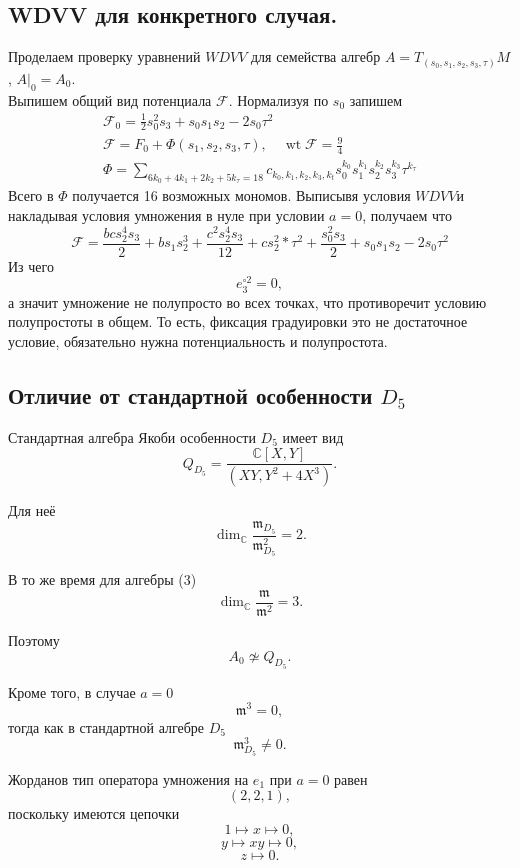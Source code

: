 \subsection{WDVV для конкретного случая.}
Проделаем проверку уравнений \(WDVV\) для семейства алгебр \(A = T_{(s_0, s_1,s_2,s_3, \tau)}M\), \(A|_0 = A_0\). \\
Выпишем общий вид потенциала \(\mathcal F\). Нормализуя по \(s_0\) запишем 
\begin{equation}
	\begin{gathered}
		\mathcal F_0 =\frac 1 2 s_0^2s_3+s_0s_1s_2-2s_0\tau^2\\
		\mathcal F = F_0 + \Phi(s_1, s_2,s_3, \tau), \quad
		\operatorname{wt}\mathcal F = \frac 9 4\\
		\Phi = \sum_{6k_0 + 4k_1 +2k_2 + 5k_\tau = 18} c_{k_0,k_1,k_2,k_3, k_t} s_0^{k_0}s_1^{k_1}s_2^{k_2}s_3^{k_3}\tau^{k_\tau}
	\end{gathered}
\end{equation}
Всего в \(\Phi\) получается 16 возможных мономов. Выписывя условия \(WDVV\)и накладывая условия умножения в нуле при условии \(a=0\), получаем что 
\begin{equation}
	\mathcal F = \frac{bcs_2^4s_3}{2} + bs_1s_2^3 +\frac{c^2s_2^4s_3}{12} + cs_2^2*\tau^2 +
	\frac{s_0^2s_3}{2 }+ s_0s_1s_2 - 2s_0\tau^2
\end{equation}
Из чего \[e_3^{\circ 2}=0,\] а значит умножение не полупросто во всех точках, что противоречит условию полупростоты в общем. То есть, фиксация градуировки это не достаточное условие, обязательно нужна потенциальность и полупростота.
\iffalse
\subsection{Отличие от стандартной особенности $D_5$}

Стандартная алгебра Якоби особенности $D_5$
имеет вид
\[
Q_{D_5}=
\frac{\mathbb C[X,Y]}
{(XY,Y^2+4X^3)}.
\]

Для неё
\[
\dim_{\mathbb C}
\frac{\mathfrak m_{D_5}}
{\mathfrak m_{D_5}^2}=2.
\]

В то же время для алгебры (3)
\[
\dim_{\mathbb C}
\frac{\mathfrak m}{\mathfrak m^2}=3.
\]

Поэтому
\[
\boxed{A_0\not\simeq Q_{D_5}.}
\]

Кроме того, в случае $a=0$
\[
\mathfrak m^3=0,
\]
тогда как в стандартной алгебре $D_5$
\[
\mathfrak m_{D_5}^3\neq0.
\]

Жорданов тип оператора умножения на $e_1$
при $a=0$ равен
\[
\boxed{(2,2,1),}
\]
поскольку имеются цепочки
\[
1\longmapsto x\longmapsto0,
\]
\[
y\longmapsto xy\longmapsto0,
\]
\[
z\longmapsto0.
\]

